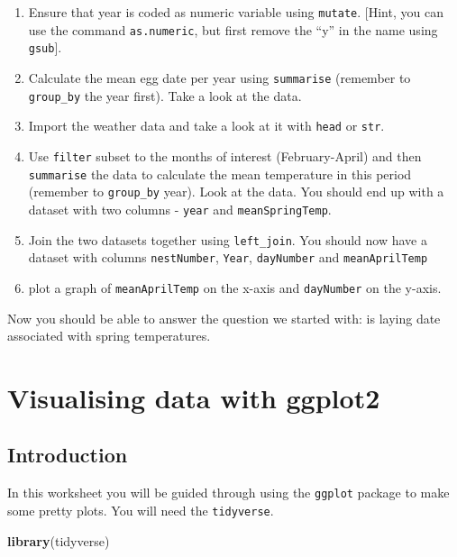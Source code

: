 \documentclass[
  a4paperpaper,
]{book}
\newenvironment{Shaded}{\begin{snugshade}}{\end{snugshade}}
\newcommand{\KeywordTok}[1]{\textcolor[rgb]{0.13,0.29,0.53}{\textbf{#1}}}
\newcommand{\NormalTok}[1]{#1}
\begin{document}
\begin{enumerate}
\def\labelenumi{\arabic{enumi}.}
\setcounter{enumi}{2}
\item
  Ensure that year is coded as numeric variable using \texttt{mutate}. {[}Hint, you can use the command \texttt{as.numeric}, but first remove the ``y'' in the name using \texttt{gsub}{]}.
\item
  Calculate the mean egg date per year using \texttt{summarise} (remember to \texttt{group\_by} the year first). Take a look at the data.
\item
  Import the weather data and take a look at it with \texttt{head} or \texttt{str}.
\item
  Use \texttt{filter} subset to the months of interest (February-April) and then \texttt{summarise} the data to calculate the mean temperature in this period (remember to \texttt{group\_by} year). Look at the data. You should end up with a dataset with two columns - \texttt{year} and \texttt{meanSpringTemp}.
\item
  Join the two datasets together using \texttt{left\_join}. You should now have a dataset with columns \texttt{nestNumber}, \texttt{Year}, \texttt{dayNumber} and \texttt{meanAprilTemp}
\item
  plot a graph of \texttt{meanAprilTemp} on the x-axis and \texttt{dayNumber} on the y-axis.
\end{enumerate}

Now you should be able to answer the question we started with: is laying date associated with spring temperatures.

\hypertarget{visualising-data-with-ggplot2}{%
\chapter{Visualising data with ggplot2}\label{visualising-data-with-ggplot2}}

\hypertarget{introduction}{%
\section{Introduction}\label{introduction}}

In this worksheet you will be guided through using the \texttt{ggplot} package to make some pretty plots. You will need the \texttt{tidyverse}.

\begin{Shaded}
\begin{Highlighting}[]
\KeywordTok{library}\NormalTok{(tidyverse)}
\end{Highlighting}
\end{Shaded}
\end{document}
